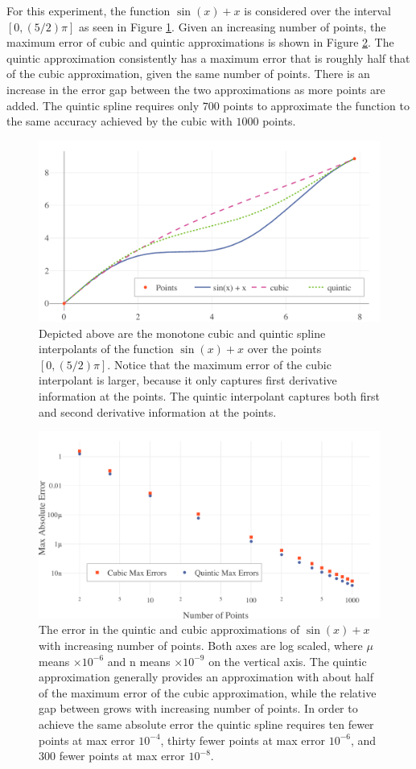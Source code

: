\documentclass{scspaperproc}
\theoremstyle{scsthe}
\begin{document}
For this experiment, the function $\sin(x) + x$ is considered over the interval $[0,(5/2)\pi]$ as seen in Figure \ref{fig:cubic_quintic_sin}. Given an increasing number of points, the maximum error of cubic and quintic approximations is shown in Figure \ref{fig:experiment_1}. The quintic approximation consistently has a maximum error that is roughly half that of the cubic approximation, given the same number of points. There is an increase in the error gap between the two approximations as more points are added. The quintic spline requires only $700$ points to approximate the function to the same accuracy achieved by the cubic with $1000$ points.

\begin{figure}[h]
  \centering
  \includegraphics[width=.7\textwidth]{cubic-quintic-sin}
  \caption{Depicted above are the monotone cubic and quintic spline interpolants of the function $\sin(x) + x$ over the points $[0, (5/2) \pi]$.  Notice that the maximum error of the cubic interpolant is larger, because it only captures first derivative information at the points. The quintic interpolant captures both first and second derivative information at the points.}
  \label{fig:cubic_quintic_sin}
\end{figure}

\begin{figure}
  \centering
  \includegraphics[width=.7\textwidth]{experiment_1_errors}
  \caption{The error in the quintic and cubic approximations of $\sin(x) + x$ with increasing number of points. Both axes are log scaled, where $\mu$ means $\times 10^{-6}$ and n means $\times 10^{-9}$ on the vertical axis. The quintic approximation generally provides an approximation with about half of the maximum error of the cubic approximation, while the relative gap between grows with increasing number of points. In order to achieve the same absolute error the quintic spline requires ten fewer points at max error $10^{-4}$, thirty fewer points at max error $10^{-6}$, and $300$ fewer points at max error $10^{-8}$.}
  \label{fig:experiment_1}
\end{figure}
\end{document}

